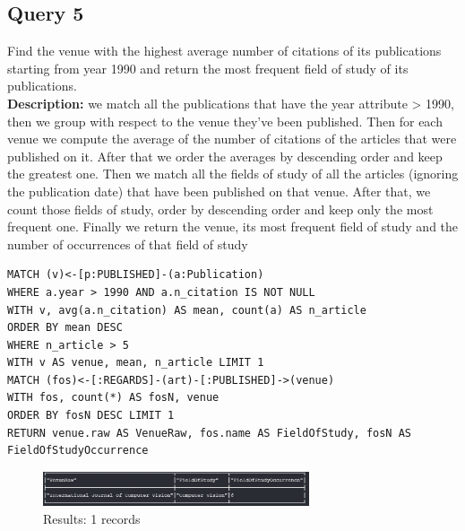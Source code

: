 \documentclass{Configuration_Files/PoliMi3i_thesis}
\begin{document}
\subsection{Query 5}
Find the venue with the highest average number of citations of its publications starting from year 1990 and return the most frequent field of study of its publications.\\
\textbf{Description:} we match all the publications that have the year attribute > 1990, then we group with respect to the venue they've been published.
Then for each venue we compute the average of the number of citations of the articles that were published on it.
After that we order the averages by descending order and keep the greatest one. Then we match all the fields of study of all the articles (ignoring the publication date)
that have been published on that venue. After that, we count those fields of study, order by descending order and keep only the most frequent one.
Finally we return the venue, its most frequent field of study and the number of occurrences of that field of study
\begin{lstlisting}[language=cypher, label=lst:cypher-example]
MATCH (v)<-[p:PUBLISHED]-(a:Publication)
WHERE a.year > 1990 AND a.n_citation IS NOT NULL
WITH v, avg(a.n_citation) AS mean, count(a) AS n_article
ORDER BY mean DESC
WHERE n_article > 5
WITH v AS venue, mean, n_article LIMIT 1
MATCH (fos)<-[:REGARDS]-(art)-[:PUBLISHED]->(venue)
WITH fos, count(*) AS fosN, venue
ORDER BY fosN DESC LIMIT 1
RETURN venue.raw AS VenueRaw, fos.name AS FieldOfStudy, fosN AS FieldOfStudyOccurrence
\end{lstlisting}
\begin{figure}[H]
\centering
\includegraphics[width=0.7\textwidth]{query/query5.PNG}
\caption{Results: 1 records}
\label{fig:query5}
\end{figure}
\end{document}
